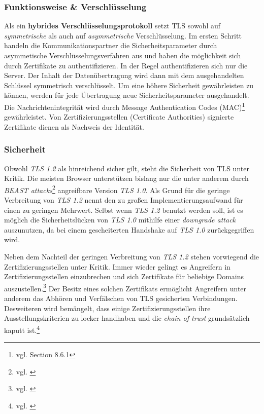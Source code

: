 \documentclass[12pt,a4paper,pointednumbers,abstracton]{scrartcl}
\begin{document}
\subsubsection{Funktionsweise \& Verschlüsselung}

Als ein \textbf{hybrides Verschlüsselungsprotokoll} setzt TLS sowohl auf \emph{symmetrische} als auch auf \emph{asymmetrische} Verschlüsselung.
Im ersten Schritt handeln die Kommunikationspartner die Sicherheitsparameter durch asymmetische Verschlüsselungsverfahren aus und haben die möglichkeit sich durch Zertifikate zu authentifizieren.
In der Regel authentifizieren sich nur die Server.
Der Inhalt der Datenübertragung wird dann mit dem ausgehandelten Schlüssel symmetrisch verschlüsselt.
Um eine höhere Sicherheit gewährleisten zu können, werden für jede Übertragung neue Sicherheitsparameter ausgehandelt.
Die Nachrichtenintegrität wird durch Message Authentication Codes (MAC)\footnote{vgl. \cite{TW10} Section 8.6.1} gewährleistet.
Von Zertifizierungsstellen (Certificate Authorities) signierte Zertifikate dienen als Nachweis der Identität.

\subsubsection{Sicherheit}
\label{sec:basics-security}

Obwohl \emph{TLS 1.2} als hinreichend sicher gilt, steht die Sicherheit von TLS unter Kritik.
Die meisten Browser unterstützen bislang nur die unter anderem durch \emph{BEAST attacks}\footnote{vgl. \cite{DR11}} angreifbare Version \emph{TLS 1.0}.
Als Grund für die geringe Verbreitung von \emph{TLS 1.2} nennt \cite{Rit12} den zu großen Implementierungsaufwand für einen zu geringen Mehrwert.
Selbst wenn \emph{TLS 1.2} benutzt werden soll, ist es möglich die Sicherheitslücken von \emph{TLS 1.0} mithilfe einer \emph{downgrade attack} auszunutzen, da bei einem gescheiterten Handshake auf \emph{TLS 1.0} zurückgegriffen wird.

Neben dem Nachteil der geringen Verbreitung von \emph{TLS 1.2} stehen vorwiegend die Zertifizierungsstellen unter Kritik.
Immer wieder gelingt es Angreifern in Zertifizierungsstellen einzubrechen und sich Zertifikate für beliebige Domains auszustellen.\footnote{vgl. \cite[Section 3]{AE12}}
Der Besitz eines solchen Zertifikats ermöglicht Angreifern unter anderem das Abhören und Verfälschen von TLS gesicherten Verbindungen.
Desweiteren wird bemängelt, dass einige Zertifizierungsstellen ihre Ausstellungskriterien zu locker handhaben und die \emph{chain of trust} grundsätzlich kaputt ist.\footnote{vgl. \cite{SS12}}
\end{document}

